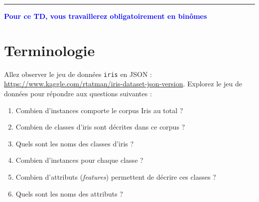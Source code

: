 
\newcommand{\numTD}{TD4}
\newcommand{\themeTD}{ScikitLearn}



\hrule
\noindent{}

\vspace{.5cm}
\textbf{\textcolor{blue}{Pour ce TD, vous travaillerez obligatoirement en binômes}}

\vspace{-.5cm}

\section{Terminologie}

 Allez observer le jeu de données \texttt{iris} en JSON : \url{https://www.kaggle.com/rtatman/iris-dataset-json-version}.
 Explorez le jeu de données pour répondre aux questions suivantes :

\begin{enumerate}
  \item Combien d'instances comporte le corpus Iris au total ?
  \vspace{-.35cm}
  \item Combien de classes d'iris sont décrites dans ce corpus ?
  \vspace{-.35cm}
  \item Quels sont les noms des classes d'iris ?
  \vspace{-.35cm}
  \item Combien d'instances pour chaque classe ?
  \vspace{-.35cm}
  \item Combien d'attributs (\textit{features}) permettent de décrire ces classes ?
  \vspace{-.35cm}
  \item Quels sont les noms des attributs ?
  \vspace{-.35cm}
\end{enumerate}

